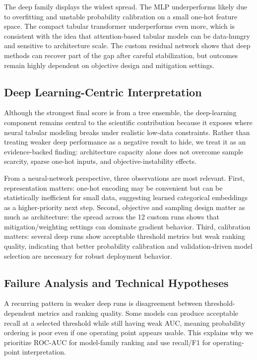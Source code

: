﻿\documentclass[11pt]{article}
\begin{document}
The deep family displays the widest spread. The MLP underperforms likely due to overfitting and unstable probability calibration on a small one-hot feature space. The compact tabular transformer underperforms even more, which is consistent with the idea that attention-based tabular models can be data-hungry and sensitive to architecture scale. The custom residual network shows that deep methods can recover part of the gap after careful stabilization, but outcomes remain highly dependent on objective design and mitigation settings.

\subsection{Deep Learning-Centric Interpretation}
Although the strongest final score is from a tree ensemble, the deep-learning component remains central to the scientific contribution because it exposes where neural tabular modeling breaks under realistic low-data constraints. Rather than treating weaker deep performance as a negative result to hide, we treat it as an evidence-backed finding: architecture capacity alone does not overcome sample scarcity, sparse one-hot inputs, and objective-instability effects.

From a neural-network perspective, three observations are most relevant. First, representation matters: one-hot encoding may be convenient but can be statistically inefficient for small data, suggesting learned categorical embeddings as a higher-priority next step. Second, objective and sampling design matter as much as architecture: the spread across the 12 custom runs shows that mitigation/weighting settings can dominate gradient behavior. Third, calibration matters: several deep runs show acceptable threshold metrics but weak ranking quality, indicating that better probability calibration and validation-driven model selection are necessary for robust deployment behavior.

\subsection{Failure Analysis and Technical Hypotheses}
A recurring pattern in weaker deep runs is disagreement between threshold-dependent metrics and ranking quality. Some models can produce acceptable recall at a selected threshold while still having weak AUC, meaning probability ordering is poor even if one operating point appears usable. This explains why we prioritize ROC-AUC for model-family ranking and use recall/F1 for operating-point interpretation.
\end{document}
